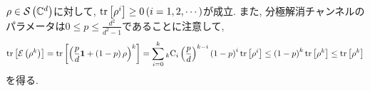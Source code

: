 \begin{ex}
    \label{ex8.18}
    $\rho \in \mathcal{S}\left({\mathbb{C}^{d}}\right)$に対して, $\mathrm{tr}\left[ \rho^i\right] \ge 0 \left( i=1,2,\cdots\right)$が成立. また, 分極解消チャンネルのパラメータは$0 \le p \le \frac{d^2}{d^2-1}$であることに注意して, 
    \begin{align*}
        \mathrm{tr}\left[ \mathcal{E} \left( \rho^k\right)\right]
        =
        \mathrm{tr}\left[ 
            \left(
                \frac{p}{d} \mathbf{1} + \left(1-p\right)\rho 
            \right)^k
            \right]
        =
        \sum_{i=0}^k
        {}_{k}\text{C}_{i}
        \left( \frac{p}{d}\right)^{k-i}
        \left(1-p\right)^i
        \mathrm{tr}\left[\rho^i\right]
        \le
        \left(1-p\right)^k \mathrm{tr}\left[\rho^k\right]
        \le
        \mathrm{tr}\left[ \rho^k\right]
    \end{align*}
    を得る. 
\end{ex}
